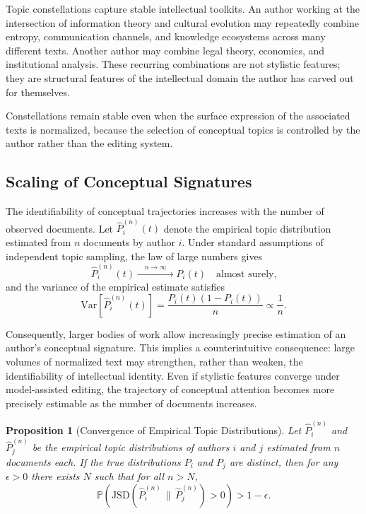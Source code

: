 \documentclass[12pt,a4paper]{article}
\theoremstyle{definition}
\theoremstyle{plain}
\newtheorem{proposition}[definition]{Proposition}
\theoremstyle{remark}
\newcommand{\Prob}{\mathbb{P}}
\begin{document}
Topic constellations capture stable intellectual toolkits. An author working at the
intersection of information theory and cultural evolution may repeatedly combine entropy,
communication channels, and knowledge ecosystems across many different texts. Another author
may combine legal theory, economics, and institutional analysis. These recurring combinations
are not stylistic features; they are structural features of the intellectual domain the
author has carved out for themselves.

Constellations remain stable even when the surface expression of the associated texts is
normalized, because the selection of conceptual topics is controlled by the author rather
than the editing system.

\subsection{Scaling of Conceptual Signatures}

The identifiability of conceptual trajectories increases with the number of observed
documents. Let $\hat{P}_i^{(n)}(t)$ denote the empirical topic distribution estimated from
$n$ documents by author $i$. Under standard assumptions of independent topic sampling, the
law of large numbers gives
\[
\hat{P}_i^{(n)}(t) \xrightarrow{\quad n \to \infty \quad} P_i(t) \quad \text{almost surely,}
\]
and the variance of the empirical estimate satisfies
\[
\mathrm{Var}\!\left[\hat{P}_i^{(n)}(t)\right] = \frac{P_i(t)(1 - P_i(t))}{n} \propto
\frac{1}{n}.
\]

Consequently, larger bodies of work allow increasingly precise estimation of an author's
conceptual signature. This implies a counterintuitive consequence: large volumes of normalized
text may strengthen, rather than weaken, the identifiability of intellectual identity. Even if
stylistic features converge under model-assisted editing, the trajectory of conceptual
attention becomes more precisely estimable as the number of documents increases.

\begin{proposition}[Convergence of Empirical Topic Distributions]
\label{prop:topicconv}
Let $\hat{P}_i^{(n)}$ and $\hat{P}_j^{(n)}$ be the empirical topic distributions of authors
$i$ and $j$ estimated from $n$ documents each. If the true distributions $P_i$ and $P_j$
are distinct, then for any $\epsilon > 0$ there exists $N$ such that for all $n > N$,
\[
\Prob\!\left( \mathrm{JSD}(\hat{P}_i^{(n)} \,\|\, \hat{P}_j^{(n)}) > 0 \right) > 1 - \epsilon.
\]
\end{proposition}
\end{document}
